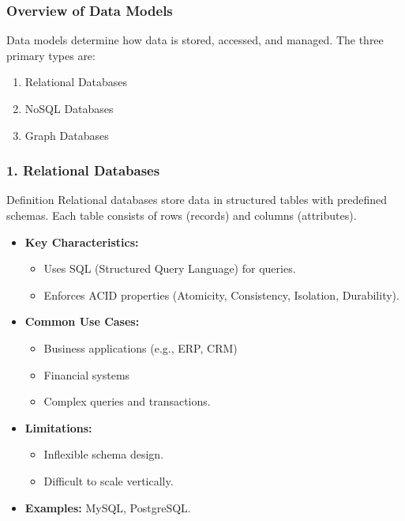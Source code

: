 \documentclass[aspectratio=169]{beamer}
\begin{document}
\begin{frame}[fragile]
    \frametitle{Overview of Data Models}
    Data models determine how data is stored, accessed, and managed. The three primary types are:
    \begin{enumerate}
        \item Relational Databases
        \item NoSQL Databases
        \item Graph Databases
    \end{enumerate}
\end{frame}

\begin{frame}[fragile]
    \frametitle{1. Relational Databases}
    \begin{block}{Definition}
        Relational databases store data in structured tables with predefined schemas. Each table consists of rows (records) and columns (attributes).
    \end{block}
    \begin{itemize}
        \item \textbf{Key Characteristics:}
        \begin{itemize}
            \item Uses SQL (Structured Query Language) for queries.
            \item Enforces ACID properties (Atomicity, Consistency, Isolation, Durability).
        \end{itemize}
        \item \textbf{Common Use Cases:}
        \begin{itemize}
            \item Business applications (e.g., ERP, CRM)
            \item Financial systems
            \item Complex queries and transactions.
        \end{itemize}
        \item \textbf{Limitations:}
        \begin{itemize}
            \item Inflexible schema design.
            \item Difficult to scale vertically.
        \end{itemize}
        \item \textbf{Examples:} MySQL, PostgreSQL.
    \end{itemize}
\end{frame}
\end{document}
